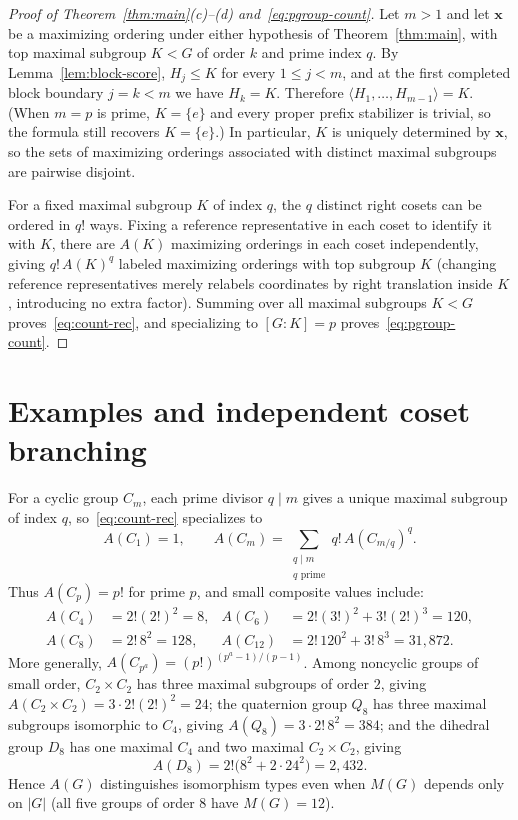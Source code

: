 \documentclass[11pt,reqno]{amsart}
\numberwithin{equation}{section}
\theoremstyle{definition}
\theoremstyle{remark}
\begin{document}
\begin{proof}[Proof of Theorem~\ref{thm:main}(c)--(d) and~\eqref{eq:pgroup-count}]
Let $m>1$ and let $\mathbf{x}$ be a maximizing ordering under either hypothesis of Theorem~\ref{thm:main}, with top maximal subgroup $K<G$ of order $k$ and prime index $q$. By Lemma~\ref{lem:block-score}, $H_j\le K$ for every $1\le j<m$, and at the first completed block boundary $j=k<m$ we have $H_k=K$. Therefore $\langle H_1,\ldots,H_{m-1}\rangle = K$. (When $m=p$ is prime, $K=\{e\}$ and every proper prefix stabilizer is trivial, so the formula still recovers $K=\{e\}$.) In particular, $K$ is uniquely determined by $\mathbf{x}$, so the sets of maximizing orderings associated with distinct maximal subgroups are pairwise disjoint.

For a fixed maximal subgroup $K$ of index $q$, the $q$ distinct right cosets can be ordered in $q!$ ways. Fixing a reference representative in each coset to identify it with $K$, there are $A(K)$ maximizing orderings in each coset independently, giving $q!\,A(K)^q$ labeled maximizing orderings with top subgroup $K$ (changing reference representatives merely relabels coordinates by right translation inside $K$, introducing no extra factor). Summing over all maximal subgroups $K<G$ proves~\eqref{eq:count-rec}, and specializing to $[G:K]=p$ proves~\eqref{eq:pgroup-count}.
\end{proof}

\section{Examples and independent coset branching}
\label{sec:examples}

For a cyclic group $C_m$, each prime divisor $q\mid m$ gives a unique maximal subgroup of index $q$, so~\eqref{eq:count-rec} specializes to
\begin{equation}
\label{eq:cyclic-rec}
A(C_1)=1,\qquad A(C_m)=\sum_{\substack{q\mid m\\ q\text{ prime}}} q!\, A(C_{m/q})^q.
\end{equation}
Thus $A(C_p)=p!$ for prime $p$, and small composite values include:
\begin{align*}
A(C_4) &= 2!(2!)^2 = 8, &
A(C_6) &= 2!(3!)^2 + 3!(2!)^3 = 120,\\
A(C_8) &= 2!\,8^2 = 128, &
A(C_{12}) &= 2!\,120^2 + 3!\,8^3 = 31{,}872.
\end{align*}
More generally, $A(C_{p^a})=(p!)^{(p^a-1)/(p-1)}$. Among noncyclic groups of small order, $C_2\times C_2$ has three maximal subgroups of order $2$, giving $A(C_2\times C_2)=3\cdot 2!(2!)^2=24$; the quaternion group $Q_8$ has three maximal subgroups isomorphic to $C_4$, giving $A(Q_8)=3\cdot 2!\,8^2=384$; and the dihedral group $D_8$ has one maximal $C_4$ and two maximal $C_2\times C_2$, giving
\[
A(D_8) = 2!\bigl(8^2 + 2\cdot 24^2\bigr) = 2{,}432.
\]
Hence $A(G)$ distinguishes isomorphism types even when $M(G)$ depends only on $|G|$ (all five groups of order $8$ have $M(G)=12$).
\end{document}
